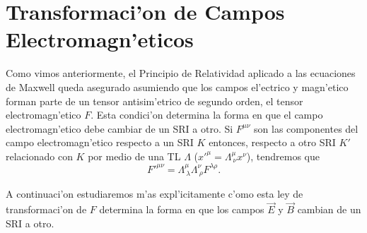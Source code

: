 \section{Transformaci'on de Campos Electromagn'eticos}
Como vimos anteriormente, el Principio de Relatividad aplicado a las ecuaciones de Maxwell queda asegurado asumiendo que los campos el'ectrico y magn'etico forman parte de un tensor antisim'etrico de segundo orden, el tensor electromagn'etico $F$. Esta condici'on determina la forma en
que el campo electromagn'etico debe cambiar de un SRI a otro. Si $F^{\mu\nu}$
son las componentes del campo electromagn'etico respecto a un SRI $K$ entonces,
respecto a otro SRI $K'$ relacionado con $K$ por medio de una TL $\Lambda$
($x'^\mu=\Lambda^\mu_{\  \nu}x^\nu$), tendremos que
\begin{equation}
F'^{\mu\nu}=\Lambda^\mu_{\ \lambda}\Lambda^\nu_{\ \rho}F^{\lambda\rho}.
\label{FLLF}
\end{equation}

A continuaci'on estudiaremos m'as expl'icitamente c'omo esta ley de transformaci'on de $F$ determina
la forma en que los campos $\vec{E}$ y $\vec{B}$ cambian de un SRI a otro.

